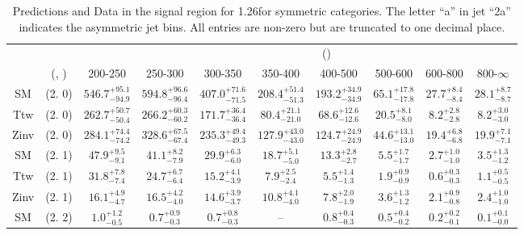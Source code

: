 \begin{table}[h!]
\tiny
\centering
\caption{Predictions and Data in the signal region for 1.26\ifb for symmetric categories. The letter ``a'' in jet \eg ``2a''  indicates the asymmetric jet bins. All entries are non-zero but are truncated to one decimal place.\label{tab:prednodata_comb_sig_sym}}
\begin{tabular}
{cccccccccc}
	\hline\hline
&	&	& \multicolumn{8}{c}{\scalht (\gev)}\\ 
	&	 (\njet, \nb) & 200-250 & 250-300 & 300-350 & 350-400 & 400-500 & 500-600 & 600-800 & 800-$\infty$ \\ [0.8ex] 
\hline
	SM & (2. 0) & $546.7^{+ 95.1 }_{- 94.9 }$ & $594.8^{+ 96.6 }_{- 96.4 }$ & $407.0^{+ 71.6 }_{- 71.5 }$ & $208.4^{+ 51.4 }_{- 51.3 }$ & $193.2^{+ 34.9 }_{- 34.9 }$ & $65.1^{+ 17.8 }_{- 17.8 }$ & $27.7^{+ 8.4 }_{- 8.4 }$ & $28.1^{+ 8.7 }_{- 8.7 }$ \\[0.5ex] 
	Ttw & (2. 0) & $262.7^{+ 50.7 }_{- 50.4 }$ & $266.2^{+ 60.3 }_{- 60.2 }$ & $171.7^{+ 36.4 }_{- 36.4 }$ & $80.4^{+ 21.1 }_{- 21.0 }$ & $68.6^{+ 12.6 }_{- 12.6 }$ & $20.5^{+ 8.1 }_{- 8.0 }$ & $8.2^{+ 2.8 }_{- 2.8 }$ & $8.2^{+ 3.0 }_{- 3.0 }$ \\[0.5ex] 
	Zinv & (2. 0) & $284.1^{+ 74.4 }_{- 74.2 }$ & $328.6^{+ 67.5 }_{- 67.4 }$ & $235.3^{+ 49.4 }_{- 49.3 }$ & $127.9^{+ 43.0 }_{- 43.0 }$ & $124.7^{+ 24.9 }_{- 24.9 }$ & $44.6^{+ 13.1 }_{- 13.0 }$ & $19.4^{+ 6.8 }_{- 6.8 }$ & $19.9^{+ 7.1 }_{- 7.1 }$ \\[0.5ex] 
	SM & (2. 1) & $47.9^{+ 9.5 }_{- 9.1 }$ & $41.1^{+ 8.2 }_{- 7.9 }$ & $29.9^{+ 6.3 }_{- 6.0 }$ & $18.7^{+ 5.1 }_{- 5.0 }$ & $13.3^{+ 2.8 }_{- 2.7 }$ & $5.5^{+ 1.7 }_{- 1.7 }$ & $2.7^{+ 1.0 }_{- 1.0 }$ & $3.5^{+ 1.3 }_{- 1.2 }$ \\[0.5ex] 
	Ttw & (2. 1) & $31.8^{+ 7.8 }_{- 7.4 }$ & $24.7^{+ 6.7 }_{- 6.4 }$ & $15.2^{+ 4.1 }_{- 3.9 }$ & $7.9^{+ 2.5 }_{- 2.4 }$ & $5.5^{+ 1.4 }_{- 1.3 }$ & $1.9^{+ 0.9 }_{- 0.9 }$ & $0.6^{+ 0.3 }_{- 0.3 }$ & $1.1^{+ 0.5 }_{- 0.5 }$ \\[0.5ex] 
	Zinv & (2. 1) & $16.1^{+ 4.9 }_{- 4.7 }$ & $16.5^{+ 4.2 }_{- 4.0 }$ & $14.6^{+ 3.9 }_{- 3.7 }$ & $10.8^{+ 4.1 }_{- 4.0 }$ & $7.8^{+ 2.0 }_{- 1.9 }$ & $3.6^{+ 1.3 }_{- 1.2 }$ & $2.1^{+ 0.9 }_{- 0.8 }$ & $2.4^{+ 1.0 }_{- 1.0 }$ \\[0.5ex] 
	SM & (2. 2) & $1.0^{+ 1.2 }_{- 0.5 }$ & $0.7^{+ 0.9 }_{- 0.3 }$ & $0.7^{+ 0.8 }_{- 0.3 }$ & -- & $0.8^{+ 0.4 }_{- 0.3 }$ & $0.5^{+ 0.4 }_{- 0.2 }$ & $0.2^{+ 0.2 }_{- 0.1 }$ & $0.1^{+ 0.1 }_{- 0.0 }$ \\[0.5ex] 

\end{tabular}
\end{table}
